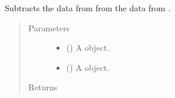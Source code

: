 \documentclass[letterpaper,10pt,openany,oneside,english]{sphinxmanual}
\begin{document}
\begin{fulllineitems}
\label{\detokenize{additional_functions:fredpy.minus}}
Subtracts the data from  from the data from .
\begin{quote}\begin{description}
\item[{Parameters}] \leavevmode\begin{itemize}
\item {} 
 ({\hyperref[\detokenize{series_class:fredpy.series}]{}}) \textendash{} A {\hyperref[\detokenize{series_class:fredpy.series}]{}} object.

\item {} 
 ({\hyperref[\detokenize{series_class:fredpy.series}]{}}) \textendash{} A {\hyperref[\detokenize{series_class:fredpy.series}]{}} object.

\end{itemize}

\item[{Returns}] \leavevmode
{\hyperref[\detokenize{series_class:fredpy.series}]{}}

\end{description}\end{quote}

\end{fulllineitems}

\end{document}
